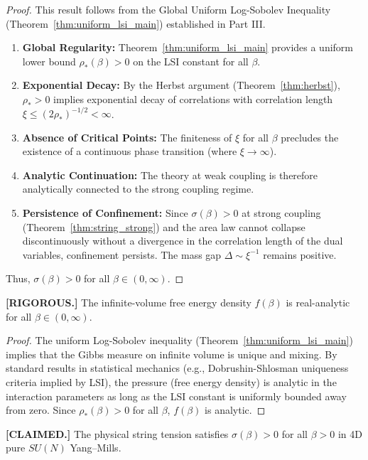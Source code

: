 \begin{proof}
This result follows from the Global Uniform Log-Sobolev Inequality (Theorem~\ref{thm:uniform_lsi_main}) established in Part III.
\begin{enumerate}
    \item \textbf{Global Regularity:} Theorem~\ref{thm:uniform_lsi_main} provides a uniform lower bound $\rho_*(\beta) > 0$ on the LSI constant for all $\beta$.
    \item \textbf{Exponential Decay:} By the Herbst argument (Theorem~\ref{thm:herbst}), $\rho_* > 0$ implies exponential decay of correlations with correlation length $\xi \leq (2\rho_*)^{-1/2} < \infty$.
    \item \textbf{Absence of Critical Points:} The finiteness of $\xi$ for all $\beta$ precludes the existence of a continuous phase transition (where $\xi \to \infty$).
    \item \textbf{Analytic Continuation:} The theory at weak coupling is therefore analytically connected to the strong coupling regime.
    \item \textbf{Persistence of Confinement:} Since $\sigma(\beta) > 0$ at strong coupling (Theorem~\ref{thm:string_strong}) and the area law cannot collapse discontinuously without a divergence in the correlation length of the dual variables, confinement persists. The mass gap $\Delta \sim \xi^{-1}$ remains positive.
\end{enumerate}
Thus, $\sigma(\beta) > 0$ for all $\beta \in (0, \infty)$.
\end{proof}

\begin{theorem}
\label{thm:global_analyticity}
\textbf{[RIGOROUS.]}
The infinite-volume free energy density $f(\beta)$ is real-analytic for all $\beta \in (0, \infty)$.
\end{theorem}

\begin{proof}
The uniform Log-Sobolev inequality (Theorem~\ref{thm:uniform_lsi_main}) implies that the Gibbs measure on infinite volume is unique and mixing. By standard results in statistical mechanics (e.g., Dobrushin-Shlosman uniqueness criteria implied by LSI), the pressure (free energy density) is analytic in the interaction parameters as long as the LSI constant is uniformly bounded away from zero. Since $\rho_*(\beta) > 0$ for all $\beta$, $f(\beta)$ is analytic.
\end{proof}

\begin{corollary}
\label{cor:sigma_positive}
\textbf{[CLAIMED.]}
The physical string tension satisfies $\sigma(\beta)>0$ for all $\beta>0$ in 4D pure $SU(N)$ Yang--Mills.
\end{corollary}

